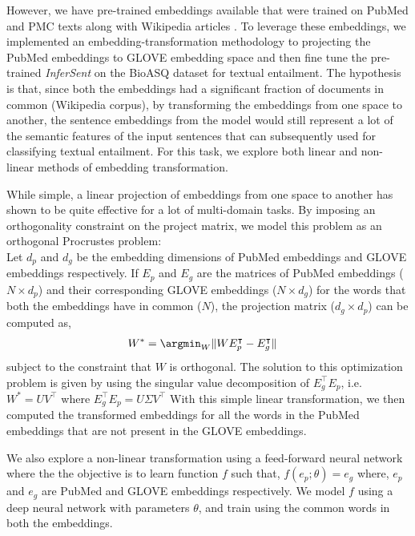 However, we have pre-trained embeddings available that were trained on PubMed and PMC texts along with Wikipedia articles \cite{biomed_embed}. To leverage these embeddings, we implemented an embedding-transformation methodology to projecting the PubMed embeddings to GLOVE embedding space and then fine tune the pre-trained \textit{InferSent} on the BioASQ dataset for textual entailment. The hypothesis is that, since both the embeddings had a significant fraction of documents in common (Wikipedia corpus), by transforming the embeddings from one space to another, the sentence embeddings from the model would still represent a lot of the semantic features of the input sentences that can subsequently used for classifying textual entailment. For this task, we explore both linear and non-linear methods of embedding transformation.

    While simple, a linear projection of embeddings from one space to another has shown to be quite effective for a lot of multi-domain tasks. By imposing an orthogonality constraint on the project matrix, we model this problem as an orthogonal Procrustes problem: \\
    Let $d_p$ and $d_g$ be the embedding dimensions of PubMed embeddings and GLOVE embeddings respectively.
    If $E_p$ and $E_g$ are the matrices of PubMed embeddings ($N \times d_p$) and their corresponding GLOVE embeddings ($N \times d_g$) for the words that both the embeddings have in common ($N$), the projection matrix ($d_g \times d_p$) can be computed as,
    \begin{align*}
        W^* &= \argmin_W \lVert  W E_p^{\intercal} - E_g^{\intercal} \rVert
    \end{align*}
    subject to the constraint that $W$ is orthogonal.
    The solution to this optimization problem is given by using the singular value decomposition of $E_g^{\intercal} E_p$, i.e.$  W^* = UV^{\intercal}$ where $E_g^{\intercal} E_p = U \Sigma V^{\intercal}$
    With this simple linear transformation, we then computed the transformed embeddings for all the words in the PubMed embeddings that are not present in the GLOVE embeddings. 

    We also explore a non-linear transformation using a feed-forward neural network where the the objective is to learn function $f$ such that, $f(e_p; \theta) = e_g$ where, $e_p$ and $e_g$ are PubMed and GLOVE embeddings respectively. We model $f$ using a deep neural network with parameters $\theta$, and train using the common words in both the embeddings. 

